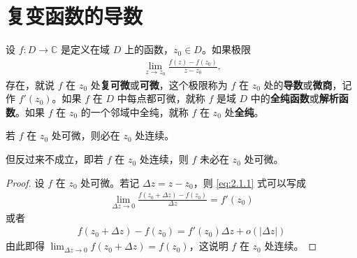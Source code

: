 \documentclass[../../main.tex]{subfiles}
\begin{document}
\section{复变函数的导数}

\begin{definition}
设 \( f:D \to \mathbb{C} \) 是定义在域 \( D \) 上的函数，\( z_0 \in D \)。如果极限
\begin{align}
\lim_{z \to z_0} \frac{f(z) - f(z_0)}{z - z_0}. \label{eq:2.1.1}
\end{align}
存在，就说 \( f \) 在 \( z_0 \) 处\textbf{复可微}或\textbf{可微}，这个极限称为 \( f \) 在 \( z_0 \) 处的\textbf{导数}或\textbf{微商}，记作 \( f'(z_0) \)。如果 \( f \) 在 \( D \) 中每点都可微，就称 \( f \) 是域 \( D \) 中的\textbf{全纯函数}或\textbf{解析函数}。如果 \( f \) 在 \( z_0 \) 的一个邻域中全纯，就称 \( f \) 在 \( z_0 \) 处\textbf{全纯}。
\end{definition}

\begin{proposition}\label{proposition:全纯函数必连续}
若 \( f \) 在 \( z_0 \) 处可微，则必在 \( z_0 \) 处连续。
\end{proposition}
\begin{remark}
但反过来不成立，即若 \( f \) 在 \( z_0 \) 处连续，则 \( f \) 未必在 \( z_0 \) 处可微。
\end{remark}
\begin{proof}
设 \( f \) 在 \( z_0 \) 处可微。若记 \( \Delta z = z - z_0 \)，则 \eqref{eq:2.1.1} 式可以写成
\begin{align*}
\lim_{\Delta z \to 0} \frac{f(z_0 + \Delta z) - f(z_0)}{\Delta z} = f'(z_0)
\end{align*}
或者
\begin{align}
f(z_0 + \Delta z) - f(z_0) = f'(z_0)\Delta z + o(|\Delta z|) \label{eq:2.1.2}
\end{align}
由此即得 \( \lim_{\Delta z \to 0} f(z_0 + \Delta z) = f(z_0) \)，这说明 \( f \) 在 \( z_0 \) 处连续。

\end{proof}
\end{document}
